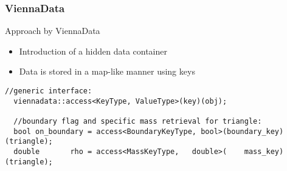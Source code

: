 \begin{frame}[fragile]
\frametitle{ViennaData}

 \begin{block}{Approach by ViennaData}
  \begin{itemize}
   \item Introduction of a hidden data container
   \item  Data is stored in a map-like manner using keys
  \end{itemize}
 \end{block}

\begin{lstlisting}[basicstyle=\scriptsize\ttfamily]
  //generic interface:
  viennadata::access<KeyType, ValueType>(key)(obj);

  //boundary flag and specific mass retrieval for triangle:
  bool on_boundary = access<BoundaryKeyType, bool>(boundary_key)(triangle);
  double       rho = access<MassKeyType,   double>(    mass_key)(triangle);
\end{lstlisting} 


\end{frame}


